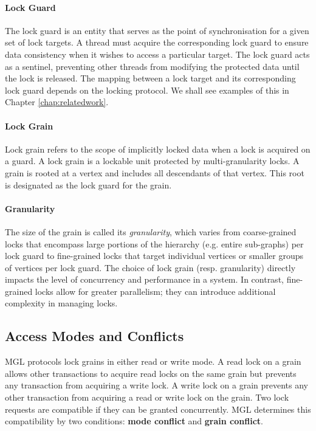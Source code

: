\paragraph{Lock Guard} The lock guard is an entity that serves as the point of synchronisation for a given set of lock targets. A thread must acquire the corresponding lock guard to ensure data consistency when it wishes to access a particular target. The lock guard acts as a sentinel, preventing other threads from modifying the protected data until the lock is released. The mapping between a lock target and its corresponding lock guard depends on the locking protocol. We shall see examples of this in Chapter \ref{chap:relatedwork}.

\paragraph{Lock Grain} Lock grain refers to the scope of implicitly locked data when a lock is acquired on a guard. A lock grain is a lockable unit protected by multi-granularity locks. A grain is rooted at a vertex and includes all descendants of that vertex. This root is designated as the lock guard for the grain.

\paragraph{Granularity} The size of the grain is called its \emph{granularity}, which varies from coarse-grained locks that encompass large portions of the hierarchy (e.g. entire sub-graphs) per lock guard to fine-grained locks that target individual vertices or smaller groups of vertices per lock guard. The choice of lock grain (resp. granularity) directly impacts the level of concurrency and performance in a system. In contrast, fine-grained locks allow for greater parallelism; they can introduce additional complexity in managing locks.

\subsection{Access Modes and Conflicts}

MGL protocols lock grains in either read or write mode. A read lock on a grain allows other transactions to acquire read locks on the same grain but prevents any transaction from acquiring a write lock. A write lock on a grain prevents any other transaction from acquiring a read or write lock on the grain.
Two lock requests are compatible if they can be granted concurrently. MGL determines this compatibility by two conditions: \textbf{mode conflict} and \textbf{grain conflict}. 

